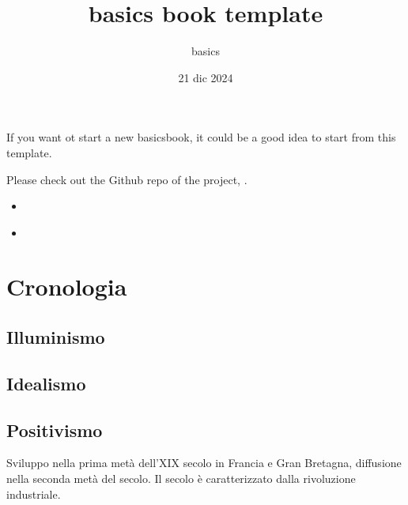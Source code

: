 \documentclass[letterpaper,10pt,italian]{jupyterBook}
\title{basics book template}
\date{21 dic 2024}
\author{basics}
\begin{document}
\pagestyle{empty}
\sphinxmaketitle
\pagestyle{plain}
\sphinxtableofcontents
\pagestyle{normal}
\label{\detokenize{intro::doc}}


\sphinxAtStartPar
If you want ot start a new basics\sphinxhyphen{}book, it could be a good idea to start from this template.

\sphinxAtStartPar
Please check out the Github repo of the project, .
\begin{itemize}
\item {} 
\sphinxAtStartPar
{\hyperref[\detokenize{ch/history::doc}]{}}

\item {} 
\sphinxAtStartPar
{\hyperref[\detokenize{ch/topics::doc}]{}}

\end{itemize}

\sphinxstepscope


\chapter{Cronologia}
\label{\detokenize{ch/history:cronologia}}\label{\detokenize{ch/history:philosophy-chronology}}\label{\detokenize{ch/history::doc}}

\section{Illuminismo}
\label{\detokenize{ch/history:illuminismo}}\label{\detokenize{ch/history:pc-illuminism}}
\begin{sphinxVerbatim}[commandchars=\\\{\}]
    

\end{sphinxVerbatim}


\section{Idealismo}
\label{\detokenize{ch/history:pc-idealism}}\label{\detokenize{ch/history:idealismo}}

\section{Positivismo}
\label{\detokenize{ch/history:positivismo}}\label{\detokenize{ch/history:pc-positivism}}
\sphinxAtStartPar
{} Sviluppo nella prima metà dell’XIX secolo in Francia e Gran Bretagna, diffusione nella seconda metà del secolo. Il secolo è caratterizzato dalla rivoluzione industriale.
\end{document}
